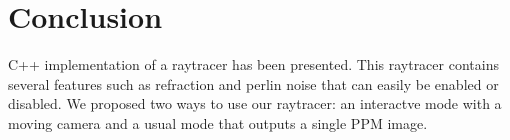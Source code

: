\documentclass[a4paper,12pt,journal,twoside,compsoc]{PPIEEEtran}
\begin{document}
\section{Conclusion}
\label{concl}
 C++ implementation of a raytracer has been presented. This
raytracer contains several features such as refraction and perlin noise that can
easily be enabled or disabled. We proposed two ways to use our raytracer: an
interactve mode with a moving camera and a usual mode that outputs a single PPM
image.




\newpage
\onecolumn
\end{document}

